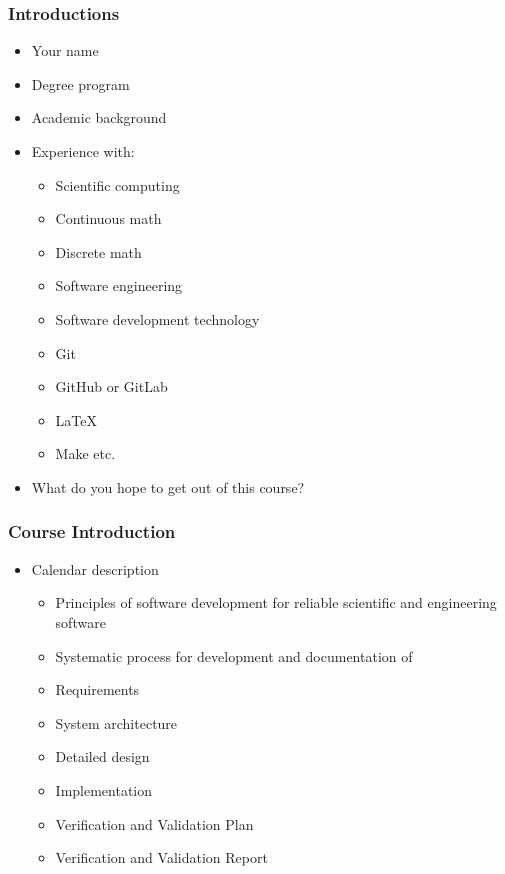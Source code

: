 \documentclass[t,12pt,numbers,fleqn]{beamer}
\begin{document}
\begin{frame}
\frametitle{Introductions}

\begin{itemize}
\item Your name
\item Degree program
\item Academic background
\item Experience with:
\begin{itemize}
\item Scientific computing
\item Continuous math
\item Discrete math
\item Software engineering
\item Software development technology
\bi
\item Git
\item GitHub or GitLab
\item LaTeX
\item Make etc.
\ei
\end{itemize}
\item What do you hope to get out of this course?
\end{itemize}

\end{frame}


\begin{frame}
\frametitle{Course Introduction}

\begin{itemize}
\item Calendar description
\begin{itemize}
\item Principles of software development for reliable scientific and engineering software
\item Systematic process for development and documentation of
\bi
\item Requirements
\item System architecture
\item Detailed design
\item Implementation
\item Verification and Validation Plan
\item Verification and Validation Report
\ei
\end{itemize}
\end{itemize}

\end{frame}
\end{document}

